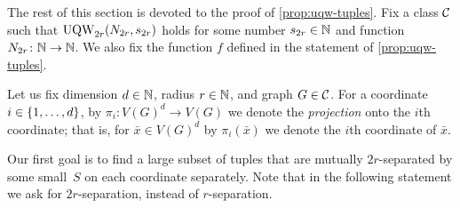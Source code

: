 The rest of this section is devoted to the proof of \cref{prop:uqw-tuples}.
Fix a class $\cal C$
such that $\uqw_{2r}(N_{2r},s_{2r})$ holds for some number $s_{2r}\in \N$ and  function $N_{2r}\from \N\to \N$.
We also fix the function $f$ defined in the statement of \cref{prop:uqw-tuples}.


\medskip

	Let us fix dimension $d\in \N$, radius $r\in \N$, and graph $G\in \cal C$.
        For a coordinate $i\in\set{1,\ldots,d}$, by $\pi_i\colon V(G)^d\to V(G)$ we denote the {\em{projection}} onto the $i$th coordinate; that is,
        for $\bar{x}\in V(G)^d$ by $\pi_i(\bar{x})$ we denote the $i$th coordinate of $\bar{x}$.
        
	
	Our first goal is to find a large subset of tuples that are mutually $2r$-separated by some small~$S$ on each coordinate separately.
	Note that in the following statement we ask for $2r$-separation, instead of $r$-separation.


